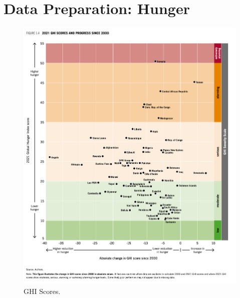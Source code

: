 \appendix


\section{Data Preparation: Hunger}
    \begin{figure}[H]
        \centering
        \includegraphics[scale=1]{Picture1}
        \caption{GHI Scores.}
        \label{fig:ann-ghi-scores}
    \end{figure}
